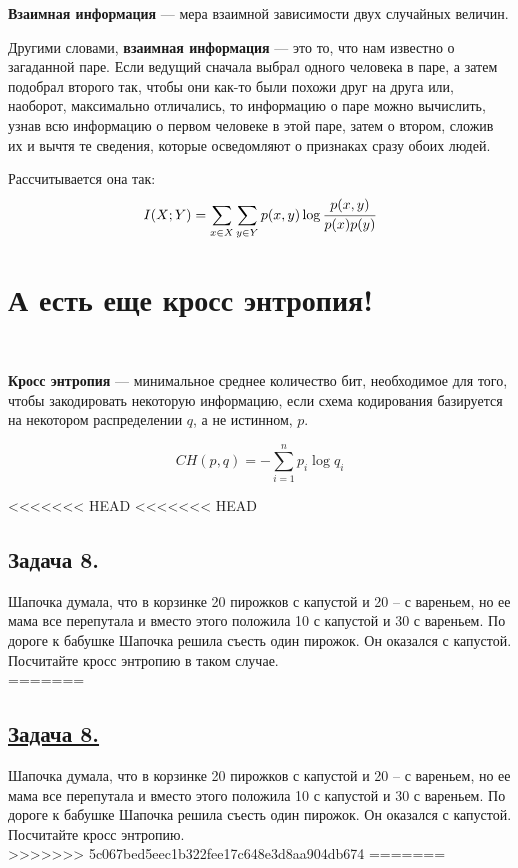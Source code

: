 \begin{siderules}
    \textbf{Взаимная информация} --- мера взаимной зависимости двух случайных величин.
\end{siderules}

Другими словами, \textbf{взаимная информация} --- это то, что нам известно о загаданной паре. Если ведущий сначала выбрал одного человека в паре, а затем подобрал второго так, чтобы они как-то были похожи друг на друга или, наоборот, максимально отличались, то информацию о паре можно вычислить, узнав всю информацию о первом человеке в этой паре, затем о втором, сложив их и вычтя те сведения, которые осведомляют о признаках сразу обоих людей.

Рассчитывается она так:
\[I(X; Y)=\sum\limits_{x\in X}\sum\limits_{y\in Y} p(x, y)\log \cfrac{p(x, y)}{p(x)p(y)} \]

\section*{А есть еще кросс энтропия!}~\
\\

\begin{siderules}
    \textbf{Кросс энтропия} --- минимальное среднее количество бит, необходимое для того, чтобы закодировать некоторую информацию, если схема кодирования базируется на некотором распределении $q$, а не истинном, $p$.
\end{siderules}

\[CH(p, q)=-\sum\limits_{i=1}^{n}p_i\log q_i \]

<<<<<<< HEAD
<<<<<<< HEAD
\subsection*{Задача 8.} Шапочка думала, что в корзинке 20 пирожков с капустой и 20 – с вареньем, но ее мама все перепутала и вместо этого положила 10 с капустой и 30 с вареньем. По дороге к бабушке Шапочка решила съесть один пирожок. Он оказался с капустой. Посчитайте кросс энтропию в таком случае.\\
=======
\subsection*{\hyperref[sec:sol_problem8]{Задача 8.}}\label{sec:problem8} Шапочка думала, что в корзинке 20 пирожков с капустой и 20 – с вареньем, но ее мама все перепутала и вместо этого положила 10 с капустой и 30 с вареньем. По дороге к бабушке Шапочка решила съесть один пирожок. Он оказался с капустой. Посчитайте кросс энтропию.\\
>>>>>>> 5c067bed5eec1b322fee17c648e3d8aa904db674
=======
